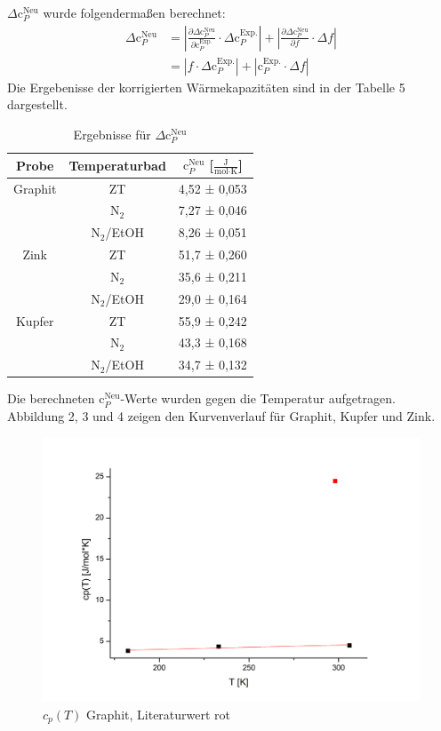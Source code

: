 \documentclass[12pt,a4paper,titlepage,headinclude,bibtotoc]{scrartcl}
\begin{document}
$\Delta\text{c}_P^{\text{Neu}}$ wurde folgendermaßen berechnet:
\begin{align}
\Delta\text{c}_P^{\text{Neu}}&= |\frac{\partial\Delta\text{c}_P^{\text{Neu}}}{\partial \text{c}_P^{\text{Exp.}}} \cdot \Delta\text{c}_P^{\text{Exp.}} |+ |\frac{\partial\Delta\text{c}_P^{\text{Neu}}}{\partial f} \cdot \Delta f|\\
&=| f \cdot \Delta\text{c}_P^{\text{Exp.}}| + |\text{c}_P^{\text{Exp.}} \cdot \Delta f |
\end{align} 
Die Ergebenisse der korrigierten Wärmekapazitäten sind in der Tabelle 5 dargestellt.
\begin{table}[h!]
\centering
\caption{Ergebnisse für $\Delta\text{c}_P^{\text{Neu}}$}
\begin{tabular}{c|c|c}
Probe&Temperaturbad&$\text{c}_P^{\text{Neu}}$ [$\frac{\text{J}}{\text{mol}\cdot\text{K}}$]\\
\hline
Graphit& ZT&4,52 ± 0,053 \\
\hline
&$\text{N}_2$&7,27 ± 0,046 \\
\hline
&$\text{N}_2$/EtOH&8,26 ± 0,051 \\
\hline
Zink &ZT& 51,7 ± 0,260\\
\hline
&$\text{N}_2$& 35,6 ± 0,211\\
\hline
&$\text{N}_2$/EtOH& 29,0 ± 0,164\\
\hline
Kupfer &ZT&55,9 ± 0,242\\
\hline
&$\text{N}_2$&43,3 ± 0,168\\
\hline
&$\text{N}_2$/EtOH& 34,7 ± 0,132\\
\end{tabular}
\end{table}
\FloatBarrier
Die berechneten $\text{c}_P^{\text{Neu}}$-Werte wurden gegen die Temperatur aufgetragen. Abbildung 2, 3 und 4 zeigen den Kurvenverlauf für Graphit, Kupfer und Zink.
\begin{figure} [h!]
\begin{center}
\includegraphics[scale=0.5]{cp(T)GraphitNeu.png} \end{center}
\caption{$c_p(T)$ Graphit, Literaturwert rot}
\end{figure} 
\FloatBarrier
\end{document}

